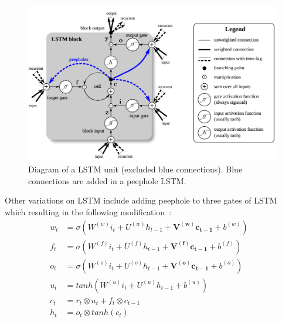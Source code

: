 \begin{figure}[H]
    \centering
    \includegraphics[scale=0.4]{figure/lstm}
    \caption[LSTM unit]{Diagram of a LSTM unit (excluded blue connections). Blue connections are added in a peephole LSTM.~\cite{lstm-search}}
    \label{fig:lstm}
\end{figure}


Other variations on LSTM include adding peephole to three gates of LSTM~\cite{peephole} which resulting in the following modification~\cite{colah-lsmt}:
\begin{align}
    w_t &= \sigma(W^{(w)}i_t + U^{(w)}h_{t-1} + \bm{V^{(w)}c_{t-1}} + b^{(w)}) &\\
      f_t &= \sigma(W^{(f)}i_t + U^{(f)}h_{t-1} + \bm{V^{(f)}c_{t-1}} + b^{(f)}) &\\
      o_t &= \sigma(W^{(o)}i_t + U^{(o)}h_{t-1} + \bm{V^{(o)}c_{t-1}} + b^{(o)}) &\\
      u_t &= tanh(W^{(u)}i_t + U^{(u)}h_{t-1} + b^{(u)}) &\\
      c_t &= r_t \otimes u_t + f_t \otimes c_{t-1} &\\
      h_t &= o_t \otimes tanh(c_t) &
\end{align}

